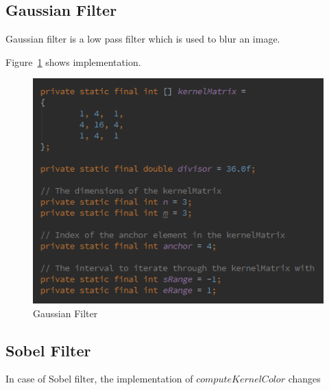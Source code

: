\documentclass{article}
\begin{document}
\subsection{Gaussian Filter}
Gaussian filter is a low pass filter which is used to blur an image.

Figure~\ref{fig:alg_gauss} shows implementation.

\begin{figure}[H]
\centering

  \includegraphics[width=0.9\linewidth]{res/algorithms/gaussian.png}
  
\caption{Gaussian Filter}
\label{fig:alg_gauss}
\end{figure}

\subsection{Sobel Filter}

In case of Sobel filter, the implementation of $computeKernelColor$ changes
\end{document}
